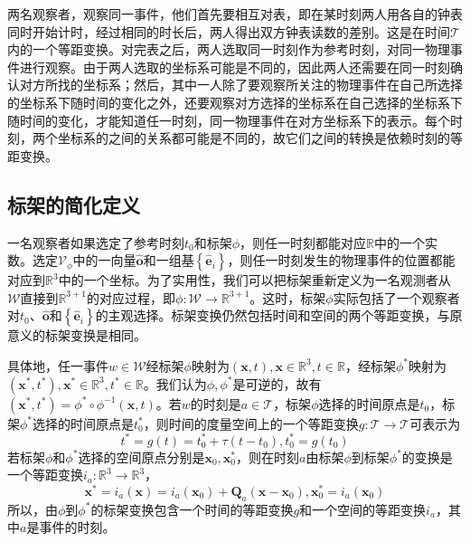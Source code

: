 \documentclass[main.tex]{subfiles}
\begin{document}
两名观察者，观察同一事件，他们首先要相互对表，即在某时刻两人用各自的钟表同时开始计时，经过相同的时长后，两人得出双方钟表读数的差别。这是在时间$\mathcal{T}$内的一个等距变换。对完表之后，两人选取同一时刻作为参考时刻，对同一物理事件进行观察。由于两人选取的坐标系可能是不同的，因此两人还需要在同一时刻确认对方所找的坐标系；然后，其中一人除了要观察所关注的物理事件在自己所选择的坐标系下随时间的变化之外，还要观察对方选择的坐标系在自己选择的坐标系下随时间的变化，才能知道任一时刻，同一物理事件在对方坐标系下的表示。每个时刻，两个坐标系的之间的关系都可能是不同的，故它们之间的转换是依赖时刻的等距变换。

\subsection{标架的简化定义}
一名观察者如果选定了参考时刻$t_0$和标架$\phi$，则任一时刻都能对应$\mathbb{R}$中的一个实数。选定$\mathcal{V}_\phi$中的一向量$\mathbf{\hat{o}}$和一组基$\left\{\mathbf{\hat{e}}_i\right\}$，则任一时刻发生的物理事件的位置都能对应到$\mathbb{R}^3$中的一个坐标。为了实用性，我们可以把标架重新定义为一名观测者从$\mathcal{W}$直接到$\mathbb{R}^{3+1}$的对应过程，即$\phi:\mathcal{W}\rightarrow\mathbb{R}^{3+1}$。这时，标架$\phi$实际包括了一个观察者对$t_0$、$\mathbf{\hat{o}}$和$\left\{\mathbf{\hat{e}}_i\right\}$的主观选择。标架变换仍然包括时间和空间的两个等距变换，与原意义的标架变换是相同。

具体地，任一事件$w\in\mathcal{W}$经标架$\phi$映射为$\left(\mathbf{x},t\right),\mathbf{x}\in\mathbb{R}^3,t\in\mathbb{R}$，经标架$\phi^*$映射为$\left(\mathbf{x}^*,t^*\right),\mathbf{x}^*\in\mathbb{R}^3,t^*\in\mathbb{R}$。我们认为$\phi,\phi^*$是可逆的，故有$\left(\mathbf{x}^*,t^*\right)=\phi^*\circ\phi^{-1}\left(\mathbf{x},t\right)$。若$w$的时刻是$a\in\mathcal{T}$，标架$\phi$选择的时间原点是$t_0$，标架$\phi^*$选择的时间原点是$t_0^*$，则时间的度量空间上的一个等距变换$g:\mathcal{T}\rightarrow\mathcal{T}$可表示为
\[t^*=g\left(t\right)=t_0^*+\tau\left(t-t_0\right),t_0^*=g\left(t_0\right)\]
若标架$\phi$和$\phi^*$选择的空间原点分别是$\mathbf{x}_0,\mathbf{x}_0^*$，则在时刻$a$由标架$\phi$到标架$\phi^*$的变换是一个等距变换$i_a:\mathbb{R}^3\rightarrow\mathbb{R}^3$，
\[\mathbf{x}^*=i_a\left(\mathbf{x}\right)=i_a\left(\mathbf{x}_0\right)+\mathbf{Q}_a\left(\mathbf{x}-\mathbf{x}_0\right),\mathbf{x}_0^*=i_a\left(\mathbf{x}_0\right)\]
所以，由$\phi$到$\phi^*$的标架变换包含一个时间的等距变换$g$和一个空间的等距变换$i_a$，其中$a$是事件的时刻。
\end{document}

